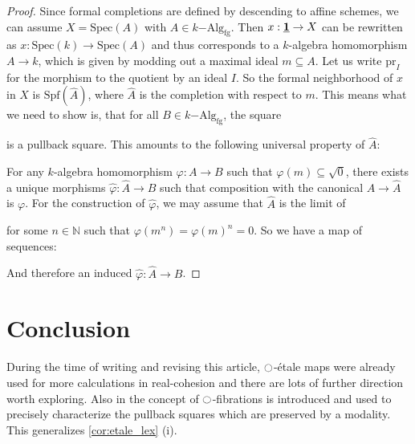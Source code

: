 \documentclass[9pt,twosided]{amsart}
\newcommand{\bN}{\mathbb N}
\newcommand{\Spec}{\ensuremath{\mathrm{Spec}}}
\newcommand{\Spf}{\ensuremath{\mathrm{Spf}}}
\newcommand{\fgkAlg}{\ensuremath{k\mathrm{-Alg}_{\mathrm{fg}}}}
\newcommand{\fgkAlgTop}{\ensuremath{k\mathrm{-Alg}_{\mathrm{fg,top}}}}
\begin{document}
\begin{proof}
  Since formal completions are defined by descending to affine schemes, we can assume $X=\Spec(A)$ with $A\in\fgkAlg$.
  Then $x:\underline{\mathbf{1}}\to X$ can be rewritten as $x:\Spec(k)\to\Spec(A)$ and thus corresponds to a $k$-algebra homomorphism $A\to k$,
  which is given by modding out a maximal ideal $m\subseteq A$. Let us write $\mathrm{pr}_I$ for the morphism to the quotient by an ideal $I$.
  So the formal neighborhood of $x$ in $X$ is $\Spf(\hat{A})$, where $\hat{A}$ is the completion with respect to $m$.
  This means what we need to show is, that for all $B\in\fgkAlg$, the square
  \begin{center}
  \end{center}
  is a pullback square. This amounts to the following universal property of $\hat{A}$:

  For any $k$-algebra homomorphism $\varphi:A\to B$ such that $\varphi(m)\subseteq \sqrt{0}$, there exists a unique morphisms
  $\hat{\varphi}:\hat{A}\to B$ such that composition with the canonical $A\to\hat{A}$ is $\varphi$.
  For the construction of $\hat{\varphi}$, we may assume that $\hat{A}$ is the limit of
  \begin{center}
  \end{center}
  for some $n\in\bN$ such that $\varphi(m^n)=\varphi(m)^n={0}$. So we have a map of sequences:
  \begin{center}
  \end{center}
  And therefore an induced $\hat{\varphi}:\hat{A}\to B$.
\end{proof}

\section{Conclusion}
During the time of writing and revising this article,
${\ocircle}$-étale maps were already used for more calculations in real-cohesion \cite{myers2019}
and there are lots of further direction worth exploring.
Also in \cite{myers2019} the concept of ${\ocircle}$-fibrations is introduced
and used to precisely characterize the pullback squares which are preserved by a modality.
This generalizes \cref{cor:etale_lex} (i).

\printbibliography
\end{document}
